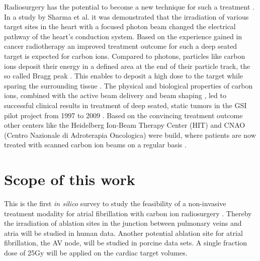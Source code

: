 Radiosurgery has the potential to become a new technique for such a treatment \cite{Ber12}. In a study by Sharma et al. \cite{Sha10} it was demonstrated 
that the irradiation of various target sites in the heart with a focused photon beam changed the electrical pathway of the heart's conduction system. 
Based on the experience gained in cancer radiotherapy an improved treatment outcome for such a deep seated target is expected for carbon ions. 
Compared to photons, particles like carbon ions deposit their energy in a defined area at the end of their particle track, the so called Bragg 
peak \cite{Wil46}. This enables to deposit a high dose to the target while sparing the surrounding tissue \cite{Kra00}. 
The physical and biological properties of carbon ions, combined with the active beam delivery and beam shaping \cite{Hab93}, 
led to successful clinical results in treatment of deep seated, static tumors in the GSI 
pilot project from 1997 to 2009 \cite{Schu07}. Based on the convincing treatment outcome other centers like the Heidelberg Ion-Beam Therapy 
Center (HIT) and CNAO (Centro Nazionale di Adroterapia Oncologica) were build, where patients are now treated with 
scanned carbon ion beams on a regular basis \cite{PTCOG13, Loe13}. 

\newpage

\section*{Scope of this work}

This is the first \textit{in silico} survey to study the feasibility of a non-invasive treatment modality for atrial fibrillation with carbon ion 
radiosurgery \cite{Ber12}. Thereby the irradiation of ablation sites in the junction between pulmonary veins and atria will be studied in human data. 
Another potential ablation site for atrial fibrillation, the AV node, will be studied in porcine data sets. A single fraction 
dose of 25Gy will be applied on the cardiac target volumes. \newline

